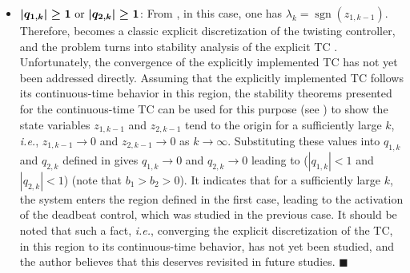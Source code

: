 \documentclass[lettersize,journal]{IEEEtran}
\DeclareMathOperator{\sgnsingle}{sgn}
\begin{document}
\begin{itemize}
  \item $\boldsymbol{|q_{1,k}|\geq 1$ or $|q_{2,k}|\geq 1}$:   From , in this case, one has $\lambda_k=\sgnsingle(z_{1,k-1})$. Therefore,   becomes a classic explicit discretization of the twisting controller, and the problem turns into stability analysis of the explicit TC . Unfortunately, the convergence of the explicitly implemented TC  has not yet been addressed directly. Assuming that the explicitly implemented TC  follows its continuous-time  behavior in this region, the stability theorems presented for the continuous-time TC can be used for this purpose (see \cite{Santiesteban_twisting,POLYAKOV_twisting,Orlov_twisting,UTKIN_twisting_stablity,Oza_twisting}) to show the state variables $z_{1,k-1}$ and $z_{2,k-1}$ tend to the origin for a sufficiently large $k$, {\em i.e.}, $z_{1,k-1} \rightarrow 0$ and $z_{2,k-1} \rightarrow 0$ as $k \rightarrow \infty$. Substituting these values into $q_{1,k}$ and $q_{2,k}$
 defined in  gives $q_{1,k} \rightarrow 0$ and $q_{2,k} \rightarrow 0$ leading to ($|q_{1,k}|< 1$ and $|q_{2,k}|<1$) (note that $b_1>b_2>0$).
It indicates that for a sufficiently large $k$, the system enters the region defined in the first case, leading to the activation of the deadbeat control, which was studied in the previous case. It should be noted that such a fact, {\em i.e.}, converging the explicit discretization of the TC, in this region to its continuous-time behavior, has not yet been studied, and the author believes that this deserves revisited in future studies. 
    $\blacksquare$
\end{itemize}








\end{document}
